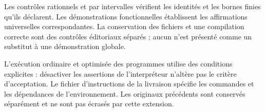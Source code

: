 Les contrôles rationnels et par intervalles vérifient les identités et
les bornes finies qu'ils déclarent. Les démonstrations fonctionnelles établissent
les affirmations universelles correspondantes. La conservation des
fichiers et une compilation correcte sont des contrôles éditoriaux séparés ;
aucun n'est présenté comme un substitut à une démonstration globale.

L'exécution ordinaire et optimisée des programmes utilise des conditions explicites : désactiver les assertions de l'interpréteur n'altère pas le critère d'acceptation. Le fichier d'instructions de la livraison spécifie les commandes et les dépendances de l'environnement. Les originaux précédents sont conservés séparément et ne sont pas écrasés par cette extension.
\par\endgroup
